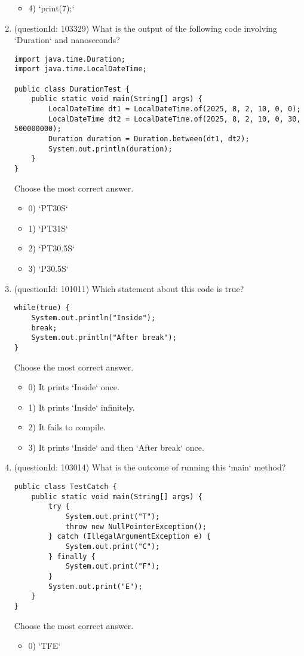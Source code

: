 \documentclass[12pt]{article}
\begin{document}
\begin{enumerate}[label=(\arabic*)]
\begin{itemize}
\item 4) `print(7);`

\end{itemize}
\item (questionId: 103329) What is the output of the following code involving `Duration` and nanoseconds?
\begin{verbatim}
import java.time.Duration;
import java.time.LocalDateTime;

public class DurationTest {
    public static void main(String[] args) {
        LocalDateTime dt1 = LocalDateTime.of(2025, 8, 2, 10, 0, 0);
        LocalDateTime dt2 = LocalDateTime.of(2025, 8, 2, 10, 0, 30, 500000000);
        Duration duration = Duration.between(dt1, dt2);
        System.out.println(duration);
    }
}
\end{verbatim}
Choose the most correct answer. 
\begin{itemize}
\item 0) `PT30S`

\item 1) `PT31S`

\item 2) `PT30.5S`

\item 3) `P30.5S`

\end{itemize}
\item (questionId: 101011) Which statement about this code is true?\n\begin{verbatim}
while(true) {
    System.out.println("Inside");
    break;
    System.out.println("After break");
}
\end{verbatim}
Choose the most correct answer. 
\begin{itemize}
\item 0) It prints `Inside` once.

\item 1) It prints `Inside` infinitely.

\item 2) It fails to compile.

\item 3) It prints `Inside` and then `After break` once.

\end{itemize}
\item (questionId: 103014) What is the outcome of running this `main` method?
\begin{verbatim}
public class TestCatch {
    public static void main(String[] args) {
        try {
            System.out.print("T");
            throw new NullPointerException();
        } catch (IllegalArgumentException e) {
            System.out.print("C");
        } finally {
            System.out.print("F");
        }
        System.out.print("E");
    }
}
\end{verbatim}
Choose the most correct answer. 
\begin{itemize}
\item 0) `TFE`


\end{itemize}
\end{enumerate}
\end{document}
